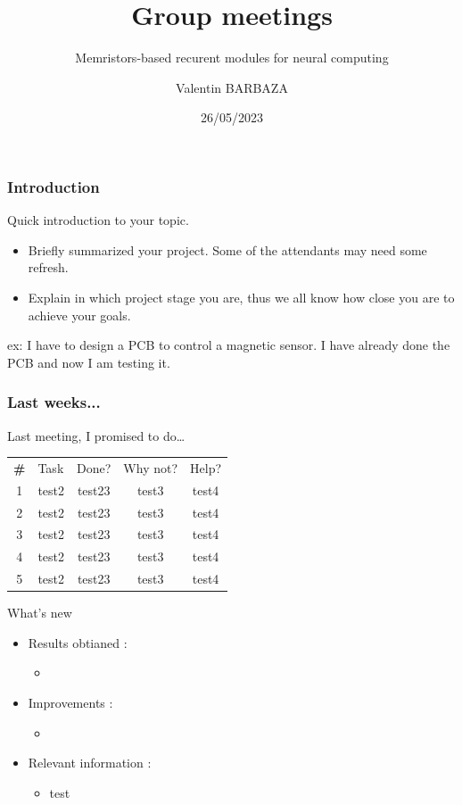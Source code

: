 \documentclass[table]{beamer}
\title{Group meetings}
\subtitle{Memristors-based recurent modules for neural computing}
\author[V. BARBAZA]{Valentin BARBAZA}
\date{26/05/2023}
\begin{document}
\frame{\titlepage}


\begin{frame}
  \frametitle{Introduction}
  Quick introduction to your topic.

  \begin{itemize}
      \color{text}
    \item Briefly summarized your project. Some of the attendants may need some refresh.
    \item Explain in which project stage you are, thus we all know how close you are to achieve your goals.
  \end{itemize}

  ex: I have to design a PCB to control a magnetic sensor. I have already done the PCB and now I am testing it.
\end{frame}


\begin{frame}
  \frametitle{Last weeks...}

  Last meeting, I promised to do…

  \centering
  \begin{tabular}{ c m{3cm} c c c }
    \rowcolor{firstRow}
    \color{white}\textbf{\#} & \centering\color{white}Task & \color{white}Done? & \color{white}Why not? & \color{white}Help? \\
    1 & test2 & test23 & test3 & test4\\
    2 & test2 & test23 & test3 & test4\\
    3 & test2 & test23 & test3 & test4\\
    4 & test2 & test23 & test3 & test4\\
    5 & test2 & test23 & test3 & test4\\
  \end{tabular}

\end{frame}

\begin{frame}{What's new}
  \begin{itemize}
    \item Results obtianed :
      \begin{itemize}
          \color{text}
        \item
      \end{itemize}
    \item Improvements :
      \begin{itemize}
          \color{text}
        \item
      \end{itemize}
    \item Relevant information :
      \begin{itemize}
          \color{text}
        \item test
      \end{itemize}
  \end{itemize}
\end{frame}
\end{document}
